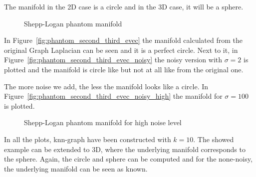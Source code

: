 The manifold in the 2D case is a circle and in the 3D case, it will be a sphere.

\begin{figure}[H]
    \centering
    \caption{Shepp-Logan phantom manifold}
    \label{fig:phantom}
\end{figure}

In Figure~\ref{fig:phantom_second_third_evec} the manifold calculated from the original Graph Laplacian
can be seen and it is a perfect circle. Next to it, in Figure~\ref{fig:phantom_second_third_evec_noisy}
the noisy version with $\sigma=2$ is plotted and the manifold is circle like but not at all like from the original one.

The more noise we add, the less the manifold looks like a circle. In Figure~\ref{fig:phantom_second_third_evec_noisy_high}
the manifold for $\sigma=100$ is plotted.

\begin{figure}[H]
    \centering
    \caption{Shepp-Logan phantom manifold for high noise level}
    \label{fig:phantom}
\end{figure}

In all the plots, knn-graph have been constructed with $k=10$. The showed example can be extended to 3D, where the underlying manifold corresponds to the sphere.
Again, the circle and sphere can be computed and for the none-noisy, the underlying manifold can be seen as known.



